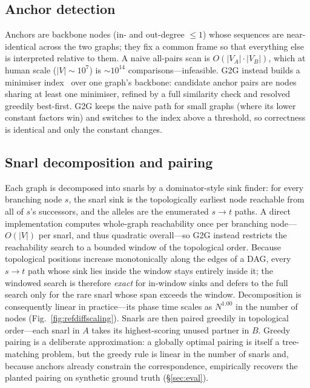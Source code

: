 \documentclass[conference]{IEEEtran}
\theoremstyle{plain}
\theoremstyle{definition}
\begin{document}
\subsection{Anchor detection}
Anchors are backbone nodes (in- and out-degree $\le 1$) whose sequences are
near-identical across the two graphs; they fix a common frame so that everything
else is interpreted relative to them. A naive all-pairs scan is
$O(|V_A|\cdot|V_B|)$, which at human scale ($|V|\sim10^7$) is $\sim10^{14}$
comparisons---infeasible. \textsc{G2G} instead builds a minimiser
index~\cite{roberts2004minimizers,li2018minimap2} over one graph's backbone:
candidate anchor pairs are nodes sharing at least one minimiser, refined by a
full similarity check and resolved greedily best-first. \textsc{G2G} keeps the
naive path for small graphs (where its lower constant factors win) and switches
to the index above a threshold, so correctness is identical and only the
constant changes.

\subsection{Snarl decomposition and pairing}
Each graph is decomposed into snarls by a dominator-style sink finder: for every
branching node $s$, the snarl sink is the topologically earliest node reachable
from all of $s$'s successors, and the alleles are the enumerated $s\!\to\!t$
paths. A direct implementation computes whole-graph reachability once per
branching node---$O(|V|)$ per snarl, and thus quadratic overall---so \textsc{G2G}
instead restricts the reachability search to a bounded window of the topological
order. Because topological positions increase monotonically along the edges of a
DAG, every $s\!\to\!t$ path whose sink lies inside the window stays entirely
inside it; the windowed search is therefore \emph{exact} for in-window sinks and
defers to the full search only for the rare snarl whose span exceeds the window.
Decomposition is consequently linear in practice---its phase time scales as
$N^{1.00}$ in the number of nodes (Fig.~\ref{fig:refdiffscaling}). Snarls are
then paired greedily in topological order---each snarl in $A$ takes its
highest-scoring unused partner in $B$. Greedy pairing is a deliberate
approximation: a globally optimal pairing is itself a tree-matching problem, but
the greedy rule is linear in the number of snarls and, because anchors already
constrain the correspondence, empirically recovers the planted pairing on
synthetic ground truth (\S\ref{sec:eval}).
\end{document}
